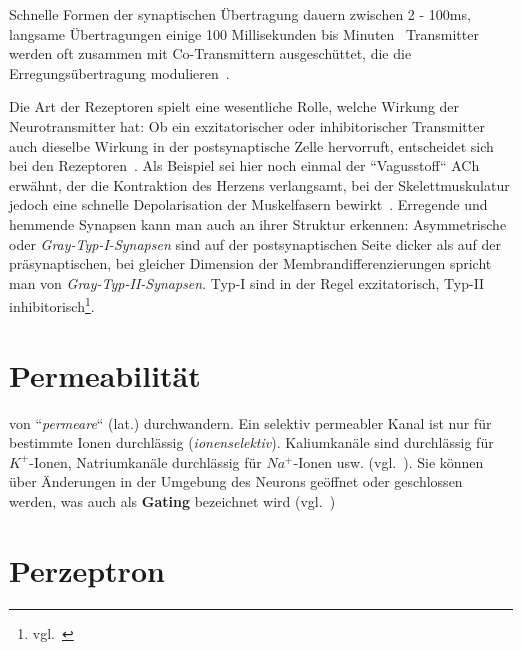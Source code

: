 Schnelle Formen der synaptischen Übertragung dauern zwischen 2 - 100ms, langsame Übertragungen einige 100 Millisekunden bis Minuten~\cite[129 f.]{BCP18} Transmitter werden oft zusammen mit Co-Transmittern ausgeschüttet, die die Erregungsübertragung modulieren~\cite[52]{SD07}.

Die Art der Rezeptoren spielt eine wesentliche Rolle, welche Wirkung der Neurotransmitter hat: Ob ein exzitatorischer oder inhibitorischer Transmitter auch dieselbe Wirkung in der postsynaptische Zelle hervorruft, entscheidet sich bei den Rezeptoren~\cite[109]{HS19b}.
Als Beispiel sei hier noch einmal der ``Vagusstoff`` ACh erwähnt, der die Kontraktion des Herzens verlangsamt, bei der Skelettmuskulatur jedoch eine schnelle Depolarisation der Muskelfasern bewirkt~\cite[137]{BCP18}.
Erregende und hemmende Synapsen kann man auch an ihrer Struktur erkennen: Asymmetrische oder \textit{Gray-Typ-I-Synapsen} sind auf der postsynaptischen Seite dicker als auf der präsynaptischen, bei gleicher Dimension der Membrandifferenzierungen spricht man von \textit{Gray-Typ-II-Synapsen}. Typ-I sind in der Regel exzitatorisch, Typ-II inhibitorisch\footnote{
    vgl.~\cite[127 u. 147]{BCP18}
    }.

\section{Permeabilität}\label{appendix:permeabel}
von ``\textit{permeare}`` (lat.) durchwandern. Ein selektiv permeabler Kanal ist nur für bestimmte Ionen durchlässig (\textit{ionenselektiv}). Kaliumkanäle sind durchlässig für $K^+$-Ionen, Natriumkanäle durchlässig für $Na^+$-Ionen usw. (vgl.~\cite[66]{BCP18}).
Sie können über Änderungen in der Umgebung des Neurons geöffnet oder geschlossen werden, was auch als \textbf{Gating} bezeichnet wird (vgl.~\cite[108]{KSJ+13})


\section{Perzeptron}\label{appendix:perzeptron}
